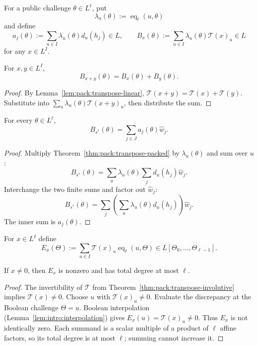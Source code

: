 \begin{definition}\label{def:pack:batch}
For a public challenge
$\theta\in L^\ell$, put
\[
 \lambda_u(\theta):=\operatorname{eq}_\ell(u,\theta)
\]
and define
\[
 a_j(\theta):=\sum_{u\in I}
       \lambda_u(\theta)d_u(h_j)\in L,\qquad
 B_x(\theta):=\sum_{u\in I}
       \lambda_u(\theta)\mathcal T(x)_u\in L
\]
for any $x\in L^I$.
\end{definition}

\begin{lemma}\label{lem:pack:batch-add}
For $x,y\in L^I$,
\[
 B_{x+y}(\theta)=B_x(\theta)+B_y(\theta).
\]
\end{lemma}
\begin{proof}
By Lemma~\ref{lem:pack:transpose-linear},
$\mathcal T(x+y)=\mathcal T(x)+\mathcal T(y)$.
Substitute into
$\sum_u\lambda_u(\theta)\mathcal T(x+y)_u$,
then distribute the sum.
\end{proof}

\begin{theorem}\label{thm:pack:batch-correct}
For every $\theta\in L^\ell$,
\[
 \boxed{
 B_{s^*}(\theta)=
   \sum_{j\in J}a_j(\theta)\widehat w_j.}
\]
\end{theorem}
\begin{proof}
Multiply Theorem~\ref{thm:pack:transpose-packed}
by $\lambda_u(\theta)$ and sum over $u$:
\[
 B_{s^*}(\theta)
 =\sum_u\lambda_u(\theta)\sum_jd_u(h_j)\widehat w_j.
\]
Interchange the two finite sums and factor
out $\widehat w_j$:
\[
 B_{s^*}(\theta)
 =\sum_j\left(\sum_u\lambda_u(\theta)d_u(h_j)\right)
      \widehat w_j.
\]
The inner sum is $a_j(\theta)$.
\end{proof}

\begin{definition}\label{def:pack:batch-error}
For $x\in L^I$ define
\[
 E_x(\Theta):=
 \sum_{u\in I}\mathcal T(x)_u
       \operatorname{eq}_\ell(u,\Theta)
 \in L[\Theta_0,\ldots,\Theta_{\ell-1}].
\]
\end{definition}

\begin{lemma}\label{lem:pack:batch-nonzero}
If $x\neq0$, then $E_x$ is nonzero and
has total degree at most $\ell$.
\end{lemma}
\begin{proof}
The invertibility of $\mathcal T$ from
Theorem~\ref{thm:pack:transpose-involutive}
implies $\mathcal T(x)\neq0$.
Choose $u$ with $\mathcal T(x)_u\neq0$.
Evaluate the discrepancy at the Boolean
challenge $\Theta=u$.
Boolean interpolation
(Lemma~\ref{lem:intro:interpolation})
gives $E_x(u)=\mathcal T(x)_u\neq0$.
Thus $E_x$ is not identically zero.
Each summand is a scalar multiple of
a product of $\ell$ affine factors,
so its total degree is at most $\ell$;
summing cannot increase it.
\end{proof}

